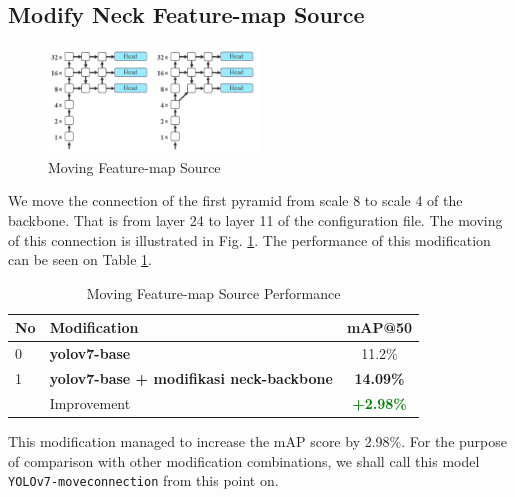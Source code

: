 \documentclass[conference]{IEEEtran}
\begin{document}
\subsection{Modify Neck Feature-map Source}
\begin{figure}[htbp]
\centerline{\includegraphics[width=0.5\textwidth]{../book/figures/deeperconn.png}}
\caption{Moving Feature-map Source}
\label{fig:deeperconn}
\end{figure}
We move the connection of the first pyramid from scale 8 to scale 4 of the backbone.
That is from layer 24 to layer 11 of the configuration file.
The moving of this connection is illustrated in Fig. \ref{fig:deeperconn}.
The performance of this modification can be seen on Table \ref{tbl:neck_backbone_perf}.
\begin{table}[htbp]
  \centering
  \caption{Moving Feature-map Source Performance}
  \label{tbl:neck_backbone_perf}
  \vspace{-1ex}
  \begin{tabular}{ l l c }
    \toprule[1.5pt]
    No & Modification                                      &mAP@50 \\
    \midrule
    0  & \textbf{yolov7-base}                            & 11.2\%\\
    1  & \textbf{yolov7-base + modifikasi neck-backbone} & \textbf{14.09\%}\\
    \midrule
       & Improvement                                & \textbf{\textcolor{green}{+2.98\%}}\\
    \bottomrule[1.5pt]
  \end{tabular}
\end{table}
This modification managed to increase the mAP score by 2.98\%.
For the purpose of comparison with other modification combinations, we shall call
this model \verb*|YOLOv7-moveconnection| from this point on.
\end{document}
